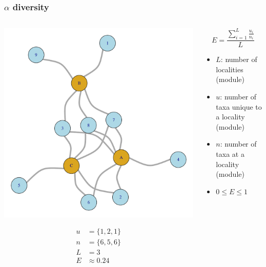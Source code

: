 \documentclass{beamer}
\begin{document}
\begin{frame}
  \frametitle{\(\alpha\) diversity}

  \begin{columns}
    \begin{column}{0.6\textwidth}
      \begin{center}
        \includegraphics[height = 0.5\textheight, width = \textwidth, keepaspectratio = true]{figure/sim_graph}

        \begin{align*}
          u &= \{1, 2, 1\}\\
          n &= \{6, 5, 6\}\\
          L &= 3\\
          E &\approx 0.24
        \end{align*}
      \end{center}
    \end{column}
    \begin{column}{0.4\textwidth}
      \[
        E = \frac{\sum_{i = 1}^{L} \frac{u_{i}}{n_{i}}}{L}
      \]

      \begin{itemize}
        \item \(L\): number of localities (module)
        \item \(u\): number of taxa unique to a locality (module)
        \item \(n\): number of taxa at a locality (module)
        \item \(0 \leq E \leq 1\)
      \end{itemize}
    \end{column}
  \end{columns}
\end{frame}
\end{document}
